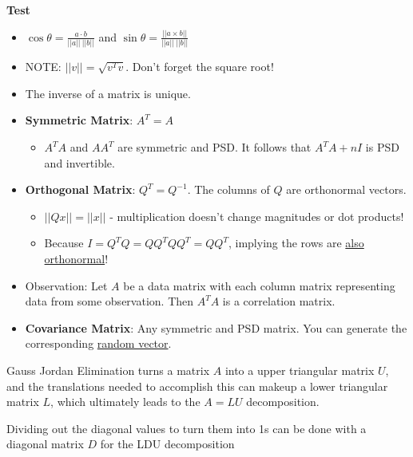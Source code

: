 \documentclass[12pt]{article} %
\begin{document}
\begin{center}
    \textbf{Test}\\
\end{center}
\begin{itemize}[topsep=-3pt, itemsep = -1pt]
    \item $\cos{\theta} = \frac{a \cdot b}{||a|| \ ||b||}$ and $\sin{\theta} = \frac{||a \times b||}{||a|| \ ||b||}$
    \item NOTE: $||v|| = \sqrt{v^Tv}$. Don't forget the square root!
    \item The inverse of a matrix is unique.
\end{itemize}

\begin{itemize}[topsep=-3pt, itemsep=-1pt]
    \item \textbf{Symmetric Matrix}: $A^T = A$
    \begin{itemize}[topsep = -1pt]
        \item $A^TA$ and $AA^T$ are symmetric and PSD. It follows that $A^TA + nI$ is PSD and invertible.
    \end{itemize}
    \item \textbf{Orthogonal Matrix}: $Q^T = Q^{-1}$. The columns of $Q$ are orthonormal vectors.
    \begin{itemize}[topsep = -1pt]
        \item $||Qx|| = ||x||$ - multiplication doesn't change magnitudes or dot products!  
        \item Because $I = Q^TQ = QQ^TQQ^T = QQ^T$, implying the rows are \underline{also orthonormal}!
    \end{itemize}
    \item Observation: Let $A$ be a data matrix with each column matrix representing data from some observation. Then $A^TA$ is a correlation matrix.
    \item \textbf{Covariance Matrix}: Any symmetric and PSD matrix. You can generate the corresponding \href{https://stats.stackexchange.com/a/221238}{random vector}.
\end{itemize}

Gauss Jordan Elimination turns a matrix $A$ into a upper triangular matrix $U$, and the translations needed to accomplish this can makeup a lower triangular matrix $L$, which ultimately leads to the $A = LU$ decomposition. 

Dividing out the diagonal values to turn them into 1s can be done with a diagonal matrix $D$ for the LDU decomposition
\end{document}

